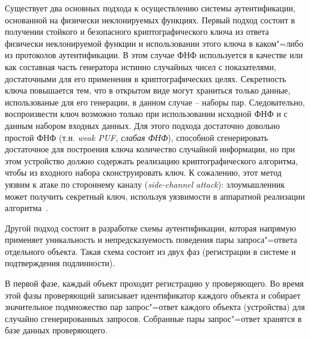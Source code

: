 Существует два основных подхода к осуществлению системы аутентификации, основанной на физически неклонируемых функциях. Первый подход состоит в получении стойкого и безопасного криптографического ключа из ответа физически неклонируемой функции и использовании этого ключа в каком"=либо из протоколов аутентификации. В этом случае ФНФ используется в качестве или как составная часть генератора истинно случайных чисел с показателями, достаточными для его применения в криптографических целях. Секретность ключа повышается тем, что в открытом виде могут храниться только данные, использованые для его генерации, в данном случае -- наборы пар. Следовательно, воспроизвести ключ возможно только при использовании исходной ФНФ и с данным набором входных данных. Для этого подхода достаточно довольно простой ФНФ (т.н. \emph{weak PUF, слабая ФНФ}), способной сгенерировать достаточное для построения ключа количество случайной информации, но при этом устройство должно содержать реализацию криптографического алгоритма, чтобы из входного набора сконструировать ключ. К сожалению, этот метод уязвим к атаке по стороннему каналу (\emph{side-channel attack}): злоумышленник может получить секретный ключ, используя уязвимости в аппаратной реализации алгоритма~\cite{pufbased_auth,puf_cryptography}.

Другой подход состоит в разработке схемы аутентификации, которая напрямую применяет уникальность и непредсказуемость поведения пары запроса"=ответа отдельного объекта. Такая схема состоит из двух фаз (регистрации в системе и подтверждения подлинности).

В первой фазе, каждый объект проходит регистрацию у проверяющего. Во время этой фазы проверяющий записывает идентификатор каждого объекта и собирает значительное подмножество пар запрос"=ответ каждого объекта (устройства) для случайно сгенерированных запросов. Собранные пары запрос"=ответ хранятся в базе данных проверяющего.


